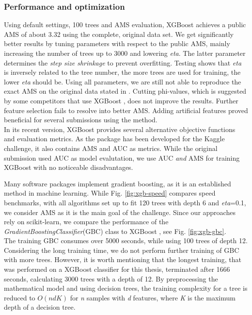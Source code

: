 \subsubsection{Performance and optimization}
Using default settings, 100 trees and AMS evaluation, XGBoost achieves a public AMS of about 3.32 using the complete, original data set. We get significantly better results by tuning parameters with respect to the public AMS, mainly increasing the number of trees up to 3000 and lowering \emph{eta}. The latter parameter determines the \emph{step size shrinkage} to prevent overfitting. Testing shows that \emph{eta} is inversely related to the tree number, the more trees are used for training, the lower \emph{eta} should be.
Using all parameters, we are still not able to reproduce the exact AMS on the original data stated in \cite{chen14}.
Cutting phi-values, which is suggested by some competitors that use XGBoost \cite{blog}, does not improve the results. Further feature selection fails to resolve into better AMS. Adding artificial features proved beneficial for several submissions using the method.\\
In its recent version, XGBoost provides several alternative objective functions and evaluation metrics. As the package has been developed for the Kaggle challenge, it also contains AMS and AUC as metrics. While the original submission used AUC as model evalutation, we use AUC \emph{and} AMS for training XGBoost with no noticeable disadvantages.

Many software packages implement gradient boosting, as it is an established method in machine learning. While Fig. \ref{fig:xgb-speed} compares speed benchmarks, with all algorithms set up to fit 120 trees with depth 6 and \emph{eta}=0.1, we consider AMS as it is the main goal of the challenge. Since our approaches rely on scikit-learn, we compare the performance of the \emph{GradientBoostingClassifier}(GBC) class to XGBoost , see Fig. \ref{fig:xgb-gbc}.\\
The training GBC consumes over 5000 seconds, while using 100 trees of depth 12. Considering the long training time, we do not perform further training of GBC with more trees. However, it is worth mentioning that the longest training, that was performed on a XGBoost classifier for this thesis, terminated after 1666 seconds, calculating 3000 trees with a depth of 12.
By preprocessing the mathematical model and using decision trees, the training complexity for a tree is reduced to $O(ndK)$ for \emph{n} samples with \emph{d} features, where \emph{K} is the maximum depth of a decision tree\cite{chen14}.

